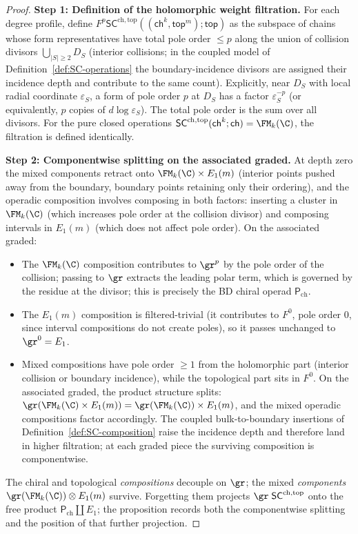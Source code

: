 \begin{proof}
\textbf{Step 1: Definition of the holomorphic weight filtration.}
For each degree profile, define $F^p \mathsf{SC}^{\mathrm{ch,top}}((\mathsf{ch}^k, \mathsf{top}^m); \mathsf{top})$ as the subspace of chains whose form representatives have total pole order $\le p$ along the union of collision divisors $\bigcup_{|S| \ge 2} D_S$ (interior collisions; in the coupled model of Definition~\ref{def:SC-operations} the boundary-incidence divisors are assigned their incidence depth and contribute to the same count). Explicitly, near $D_S$ with local radial coordinate $\varepsilon_S$, a form of pole order $p$ at $D_S$ has a factor $\varepsilon_S^{-p}$ (or equivalently, $p$ copies of $d\log\varepsilon_S$). The total pole order is the sum over all divisors. For the pure closed operations $\mathsf{SC}^{\mathrm{ch,top}}(\mathsf{ch}^k; \mathsf{ch}) = \FM_k(\C)$, the filtration is defined identically.

\textbf{Step 2: Componentwise splitting on the associated graded.}
At depth zero the mixed components retract onto
$\FM_k(\C) \times E_1(m)$ (interior points pushed away from the
boundary, boundary points retaining only their ordering), and the
operadic composition involves composing in both factors: inserting
a cluster in $\FM_k(\C)$ (which increases pole order at the
collision divisor) and composing intervals in $E_1(m)$ (which does
not affect pole order). On the associated graded:
\begin{itemize}
\item The $\FM_k(\C)$ composition contributes to $\gr^p$ by the pole order of the collision; passing to $\gr$ extracts the leading polar term, which is governed by the residue at the divisor; this is precisely the BD chiral operad $\mathsf{P}_{\mathrm{ch}}$.
\item The $E_1(m)$ composition is filtered-trivial (it contributes to $F^0$, pole order 0, since interval compositions do not create poles), so it passes unchanged to $\gr^0 = E_1$.
\item Mixed compositions have pole order $\ge 1$ from the holomorphic part (interior collision or boundary incidence), while the topological part sits in $F^0$. On the associated graded, the product structure splits: $\gr(\FM_k(\C) \times E_1(m)) = \gr(\FM_k(\C)) \times E_1(m)$, and the mixed operadic compositions factor accordingly. The coupled bulk-to-boundary insertions of Definition~\ref{def:SC-composition} raise the incidence depth and therefore land in higher filtration; at each graded piece the surviving composition is componentwise.
\end{itemize}
The chiral and topological \emph{compositions} decouple on $\gr$; the mixed \emph{components} $\gr(\FM_k(\C)) \otimes E_1(m)$ survive. Forgetting them projects $\gr\;\mathsf{SC}^{\mathrm{ch,top}}$ onto the free product $\mathsf{P}_{\mathrm{ch}} \amalg E_1$; the proposition records both the componentwise splitting and the position of that further projection.


\end{proof}
